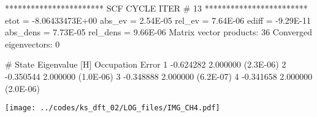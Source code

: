 \begin{textcode}
 *********************** SCF CYCLE ITER #   13 ************************
 etot  = -8.06433473E+00 abs_ev   =  2.54E-05 rel_ev   =  7.64E-06
 ediff =       -9.29E-11 abs_dens =  7.73E-05 rel_dens =  9.66E-06
Matrix vector products:     36
Converged eigenvectors:      0

#  State  Eigenvalue [H]  Occupation    Error
      1       -0.624282    2.000000   (2.3E-06)
      2       -0.350544    2.000000   (1.0E-06)
      3       -0.348888    2.000000   (6.2E-07)
      4       -0.341658    2.000000   (2.0E-06)   
\end{textcode}

{\centering
\texttt{[image: ../codes/ks\_dft\_02/LOG\_files/IMG\_CH4.pdf]}
}